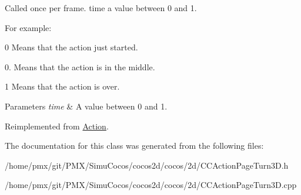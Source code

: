 Called once per frame. time a value between 0 and 1.

For example\+:
\begin{DoxyItemize}
\item 0 Means that the action just started.
\item 0. Means that the action is in the middle.
\item 1 Means that the action is over.
\end{DoxyItemize}


\begin{DoxyParams}{Parameters}
{\em time} & A value between 0 and 1. \\
\hline
\end{DoxyParams}


Reimplemented from \hyperlink{classAction_a937e646e63915e33ad05ba149bfcf239}{Action}.



The documentation for this class was generated from the following files\+:\begin{DoxyCompactItemize}
\item 
/home/pmx/git/\+P\+M\+X/\+Simu\+Cocos/cocos2d/cocos/2d/C\+C\+Action\+Page\+Turn3\+D.\+h\item 
/home/pmx/git/\+P\+M\+X/\+Simu\+Cocos/cocos2d/cocos/2d/C\+C\+Action\+Page\+Turn3\+D.\+cpp\end{DoxyCompactItemize}
